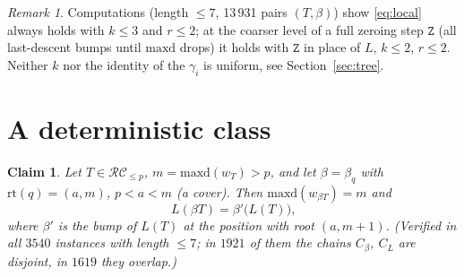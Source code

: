 \documentclass{amsart}
\newtheorem{claim}[lemma]{Claim}
\theoremstyle{definition}
\theoremstyle{remark}
\newtheorem{remark}[lemma]{Remark}
\newcommand{\RC}{\mathcal{RC}}
\newcommand{\maxd}{\mathrm{maxd}}
\newcommand{\wof}[1]{w_{#1}}
\newcommand{\zeromap}{\mathtt{Z}}
\newcommand{\rt}{\mathrm{rt}}
\begin{document}
\begin{remark}
Computations (length $\leq7$, 13\,931 pairs $(T,\beta)$) show \eqref{eq:local} always holds with $k\leq3$ and $r\leq2$; at the coarser level of a full zeroing step $\zeromap$ (all last-descent bumps until $\maxd$ drops) it holds with $\zeromap$ in place of $L$, $k\leq2$, $r\leq2$. Neither $k$ nor the identity of the $\gamma_i$ is uniform, see Section~\ref{sec:tree}.
\end{remark}

\section{A deterministic class}\label{sec:clean}

\begin{claim}\label{claim:clean}
Let $T\in\RC_{\leq p}$, $m=\maxd(\wof T)>p$, and let $\beta=\beta_q$ with $\rt(q)=(a,m)$, $p<a<m$ (a cover). Then $\maxd(\wof{\beta T})=m$ and
$$L(\beta T)=\beta'\bigl(L(T)\bigr)\text{,}$$
where $\beta'$ is the bump of $L(T)$ at the position with root $(a,m+1)$. (Verified in all $3540$ instances with length $\leq7$; in $1921$ of them the chains $C_\beta$, $C_L$ are disjoint, in $1619$ they overlap.)
\end{claim}
\end{document}
